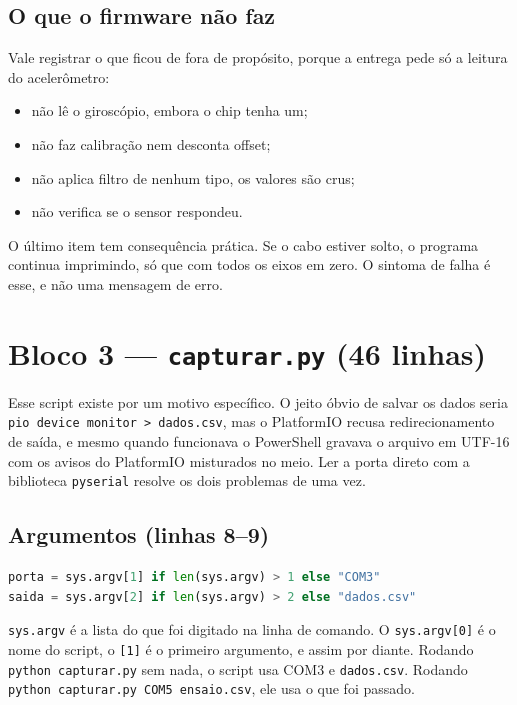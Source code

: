 \documentclass[11pt,a4paper]{article}
\begin{document}
\subsection{O que o firmware não faz}

Vale registrar o que ficou de fora de propósito, porque a entrega pede só a
leitura do acelerômetro:

\begin{itemize}
  \item não lê o giroscópio, embora o chip tenha um;
  \item não faz calibração nem desconta offset;
  \item não aplica filtro de nenhum tipo, os valores são crus;
  \item não verifica se o sensor respondeu.
\end{itemize}

O último item tem consequência prática. Se o cabo estiver solto, o programa
continua imprimindo, só que com todos os eixos em zero. O sintoma de falha é
esse, e não uma mensagem de erro.

\newpage
\section{Bloco 3 --- \texttt{capturar.py} (46 linhas)}

Esse script existe por um motivo específico. O jeito óbvio de salvar os dados
seria \texttt{pio device monitor > dados.csv}, mas o PlatformIO recusa
redirecionamento de saída, e mesmo quando funcionava o PowerShell gravava o
arquivo em UTF-16 com os avisos do PlatformIO misturados no meio. Ler a porta
direto com a biblioteca \texttt{pyserial} resolve os dois problemas de uma
vez.

\subsection{Argumentos (linhas 8--9)}

\begin{lstlisting}[language=Python,firstnumber=8]
porta = sys.argv[1] if len(sys.argv) > 1 else "COM3"
saida = sys.argv[2] if len(sys.argv) > 2 else "dados.csv"
\end{lstlisting}

\texttt{sys.argv} é a lista do que foi digitado na linha de comando. O
\texttt{sys.argv[0]} é o nome do script, o \texttt{[1]} é o primeiro
argumento, e assim por diante. Rodando \texttt{python capturar.py} sem nada, o
script usa COM3 e \texttt{dados.csv}. Rodando
\texttt{python capturar.py COM5 ensaio.csv}, ele usa o que foi passado.
\end{document}
